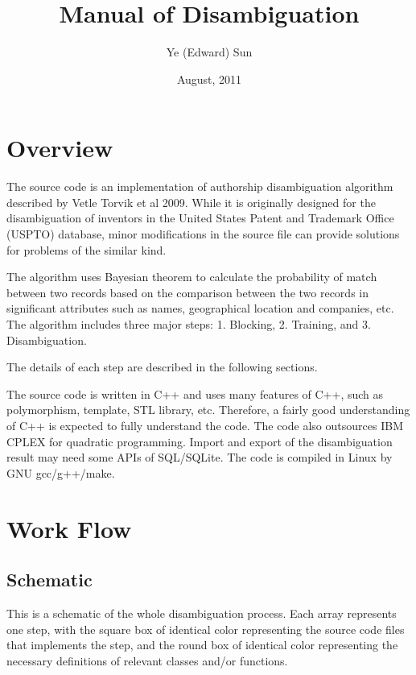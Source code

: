 \documentclass{article}
\begin{document}
\title{Manual of Disambiguation}
\author{Ye (Edward) Sun}
\date{August, 2011}
\maketitle

\section{Overview}

The source code is an implementation of authorship 
disambiguation algorithm described by Vetle
Torvik et al 2009. While it is originally designed 
for the disambiguation of inventors in the United
States Patent and Trademark Office (USPTO) database, 
minor modifications in the source file can
provide solutions for problems of the similar kind.

The algorithm uses Bayesian theorem to calculate the 
probability of match between two records based
on the comparison between the two records in significant 
attributes such as names, geographical location and companies, 
etc. The algorithm includes three major steps: 1. Blocking,
 2. Training, and 3. Disambiguation. 

The details of each step are described in the following sections.

The source code is written in C++ and uses many features 
of C++, such as polymorphism, template, STL library, etc. 
Therefore, a fairly good understanding of C++ is expected 
to fully understand the code. The code also outsources 
IBM CPLEX for quadratic programming. Import and export of the
disambiguation result may need some APIs of SQL/SQLite. 
The code is compiled in Linux by GNU gcc/g++/make.


\section{Work Flow}

\subsection{Schematic}

This is a schematic of the whole disambiguation process. 
Each array represents one step, with the
square box of identical color representing the source 
code files that implements the step, and the round
box of identical color representing the necessary 
definitions of relevant classes and/or functions.
\end{document}
